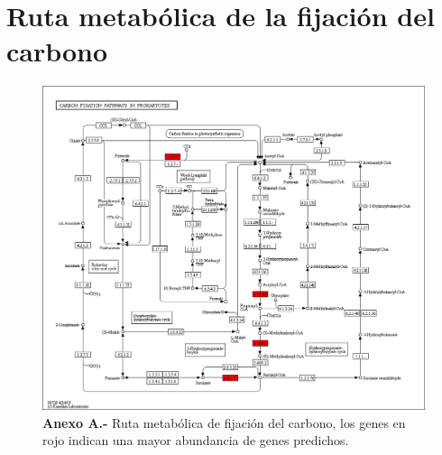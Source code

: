 \documentclass[12pt,letterpaper,oneside]{report}
\begin{document}
\chapter{Ruta metabólica de la fijación del carbono}
\begin{figure}[!h]
\centering
\centerline{\includegraphics[width=18cm]{apendices/A-1}}
\caption*{\textbf{Anexo A.-} Ruta metabólica de fijación del carbono, los genes en rojo indican una mayor abundancia de genes predichos.}
\end{figure}
\end{document}
